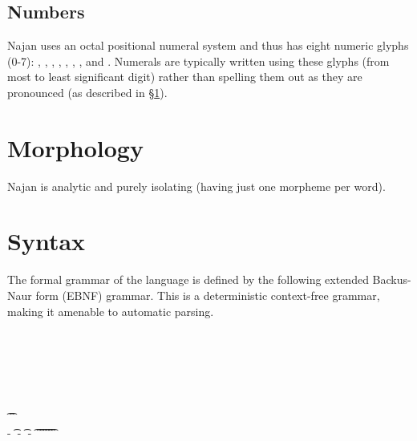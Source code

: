 \subsection{Numbers}


Najan uses an octal positional numeral system and thus has eight numeric glyphs
(0-7): , , , , , , , and
. Numerals are typically written using these glyphs (from most to least
significant digit) rather than spelling them out as they are pronounced (as
described in \S\ref{sec:morphology}).

\section{Morphology} \label{sec:morphology}

Najan is analytic and purely isolating (having just one morpheme per word).

\section{Syntax} \label{sec:syntax}

The formal grammar of the language is defined by the following extended
Backus-Naur form (EBNF) grammar. This is a deterministic context-free grammar,
making it amenable to automatic parsing.

\begin{ebnf}
	 \is {} 
	\\
	 \is {} 
	\altLine {}  
	\altLine {}  
	\\
	 \is {}
	\altLine {}
	\altLine {}
	\altLine {}
	\altLine {}  
	\\
	 \is {}  
	\\
	 \is {} \alt {}
	\altLine {}  
	\\
	 \is \t{}  \t{}
	\\
	 \is {} - \t{} - \t{} - \t{}
	\altLine \t{} \t{}
	\altLine \t{} \t{}
	\altLine \t{} \t{}
\end{ebnf}

